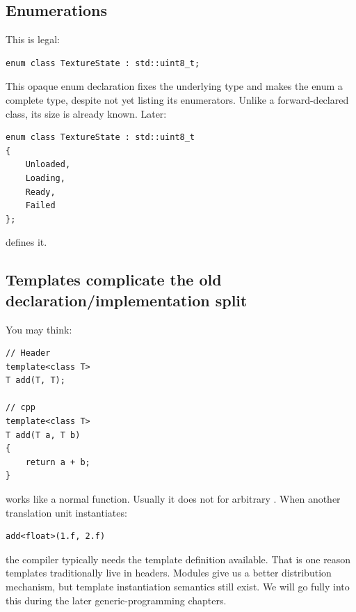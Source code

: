 \subsection{Enumerations}\label{05-engine-i-ch002-enumerations}

\hypertarget{05-engine-i-ch002-enumerations}{}

This is legal:

\begin{verbatim}
enum class TextureState : std::uint8_t;
\end{verbatim}

This opaque enum declaration fixes the underlying type and makes the enum a complete type, despite not yet listing its enumerators. Unlike a forward-declared class, its size is already known. Later:

\begin{verbatim}
enum class TextureState : std::uint8_t
{
    Unloaded,
    Loading,
    Ready,
    Failed
};
\end{verbatim}

defines it.

\subsection{Templates complicate the old declaration/implementation split}\label{05-engine-i-ch002-templates-complicate-the-old-declarationimplementation-split}

\hypertarget{05-engine-i-ch002-templates-complicate-the-old-declarationimplementation-split}{}

You may think:

\begin{verbatim}
// Header
template<class T>
T add(T, T);

// cpp
template<class T>
T add(T a, T b)
{
    return a + b;
}
\end{verbatim}

works like a normal function. Usually it does not for arbitrary . When another translation unit instantiates:

\begin{verbatim}
add<float>(1.f, 2.f)
\end{verbatim}

the compiler typically needs the template definition available. That is one reason templates traditionally live in headers. Modules give us a better distribution mechanism, but template instantiation semantics still exist. We will go fully into this during the later generic-programming chapters.

